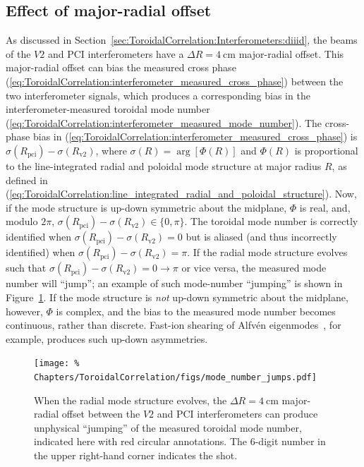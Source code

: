 \subsection{Effect of major-radial offset}
\label{sec:ToroidalCorrelation:ImplementationDetails:radial_offset}
As discussed in Section~\ref{sec:ToroidalCorrelation:Interferometers:diiid},
the beams of the $V2$ and PCI interferometers have a
$\Delta R = \SI{4}{\centi\meter}$ major-radial offset.
This major-radial offset can bias the measured cross phase
(\ref{eq:ToroidalCorrelation:interferometer_measured_cross_phase})
between the two interferometer signals,
which produces a corresponding bias
in the interferometer-measured toroidal mode number
(\ref{eq:ToroidalCorrelation:interferometer_measured_mode_number}).
The cross-phase bias in
(\ref{eq:ToroidalCorrelation:interferometer_measured_cross_phase})
is $\sigma(R_{\text{pci}}) - \sigma(R_{\text{v2}})$, where
$\sigma(R) = \arg[\Phi(R)]$ and $\Phi(R)$ is proportional to
the line-integrated radial and poloidal mode structure
at major radius $R$, as defined in
(\ref{eq:ToroidalCorrelation:line_integrated_radial_and_poloidal_structure}).
Now, if the mode structure is up-down symmetric about the midplane,
$\Phi$ is real, and, modulo $2 \pi$,
$\sigma(R_{\text{pci}}) - \sigma(R_{\text{v2}}) \in \{0, \pi\}$.
The toroidal mode number is correctly identified
when $\sigma(R_{\text{pci}}) - \sigma(R_{\text{v2}}) = 0$ but
is aliased (and thus incorrectly identified)
when $\sigma(R_{\text{pci}}) - \sigma(R_{\text{v2}}) = \pi$.
If the radial mode structure evolves such that
$\sigma(R_{\text{pci}}) - \sigma(R_{\text{v2}}) = 0 \rightarrow \pi$
or vice versa,
the measured mode number will ``jump'';
an example of such mode-number ``jumping'' is shown in
Figure~\ref{fig:ToroidalCorrelation:mode_number_jumps}.
If the mode structure is \emph{not} up-down symmetric
about the midplane, however,
$\Phi$ is complex, and
the bias to the measured mode number becomes continuous, rather than discrete.
Fast-ion shearing of Alfv\'{e}n eigenmodes~\cite{tobias_prl11},
for example, produces such up-down asymmetries.

\begin{figure}
  \centering
  \texttt{[image: \%
    Chapters/ToroidalCorrelation/figs/mode\_number\_jumps.pdf]}
  \caption[Mode-number ``jumping'' due to major-radial offset of interferometers]{%
    When the radial mode structure evolves,
    the $\Delta R = \SI{4}{\centi\meter}$ major-radial offset
    between the $V2$ and PCI interferometers can produce
    unphysical ``jumping'' of the measured toroidal mode number,
    indicated here with red circular annotations.
    The $6$-digit number in the upper right-hand corner
    indicates the \diiid\space shot.
  }
\label{fig:ToroidalCorrelation:mode_number_jumps}
\end{figure}

